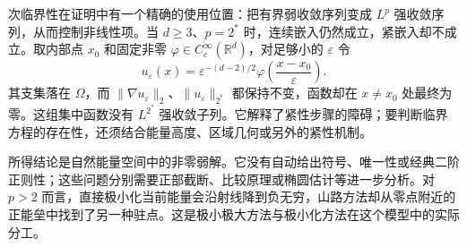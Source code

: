 次临界性在证明中有一个精确的使用位置：把有界弱收敛序列变成 \(L^p\) 强收敛序列，从而控制非线性项。当 \(d\ge3\)、\(p=2^*\) 时，连续嵌入仍然成立，紧嵌入却不成立。取内部点 \(x_0\) 和固定非零 \(\varphi\in C_c^\infty(\mathbb R^d)\)，对足够小的 \(\varepsilon\) 令
\[
 u_\varepsilon(x)=\varepsilon^{-(d-2)/2}
               \varphi\left(\frac{x-x_0}{\varepsilon}\right).
\]
其支集落在 \(\Omega\)，而 \(\|\nabla u_\varepsilon\|_2\)、\(\|u_\varepsilon\|_{2^*}\) 都保持不变，函数却在 \(x\ne x_0\) 处最终为零。这组集中函数没有 \(L^{2^*}\) 强收敛子列。它解释了紧性步骤的障碍；要判断临界方程的存在性，还须结合能量高度、区域几何或另外的紧性机制。

\ProseParagraphBreak

所得结论是自然能量空间中的非零弱解。它没有自动给出符号、唯一性或经典二阶正则性；这些问题分别需要正部截断、比较原理或椭圆估计等进一步分析。对 \(p>2\) 而言，直接极小化当前能量会沿射线降到负无穷，山路方法却从零点附近的正能垒中找到了另一种驻点。这是极小极大方法与极小化方法在这个模型中的实际分工。
